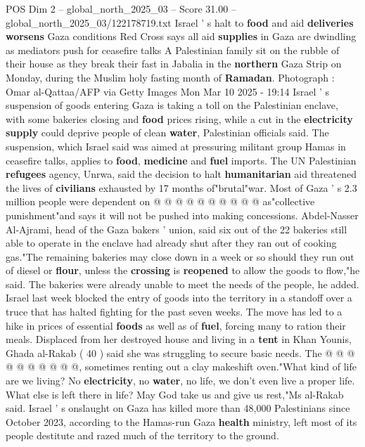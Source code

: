 \begin{textsample}{POS Dim 2 – global\_north\_2025\_03 – Score 31.00 – global\_north\_2025\_03/122178719.txt}  \label{ex:f2_pos_401}
Israel ' s halt to \textbf{food} and aid \textbf{deliveries} \textbf{worsens} Gaza conditions Red Cross says all aid \textbf{supplies} in Gaza are dwindling as mediators push for ceasefire talks A Palestinian family sit on the rubble of their house as they break their fast in Jabalia in the \textbf{northern} Gaza Strip on Monday, during the Muslim holy fasting month of \textbf{Ramadan}.
Photograph : Omar al-Qattaa/AFP via Getty Images Mon Mar 10 2025 - 19:14 Israel ' s suspension of goods entering Gaza is taking a toll on the Palestinian enclave, with some bakeries closing and \textbf{food} prices rising, while a cut in the \textbf{electricity} \textbf{supply} could deprive people of clean \textbf{water}, Palestinian officials said.
The suspension, which Israel said was aimed at pressuring militant group Hamas in ceasefire talks, applies to \textbf{food}, \textbf{medicine} and \textbf{fuel} imports.
The UN Palestinian \textbf{refugees} agency, Unrwa, said the decision to halt \textbf{humanitarian} aid threatened the lives of \textbf{civilians} exhausted by 17 months of"brutal"war.
Most of Gaza ' s 2.3 million people were dependent on @ @ @ @ @ @ @ @ @ @ as"collective punishment"and says it will not be pushed into making concessions.
Abdel-Nasser Al-Ajrami, head of the Gaza bakers ' union, said six out of the 22 bakeries still able to operate in the enclave had already shut after they ran out of cooking gas."The remaining bakeries may close down in a week or so should they run out of diesel or \textbf{flour}, unless the \textbf{crossing} is \textbf{reopened} to allow the goods to flow,"he said.
The bakeries were already unable to meet the needs of the people, he added.
Israel last week blocked the entry of goods into the territory in a standoff over a truce that has halted fighting for the past seven weeks.
The move has led to a hike in prices of essential \textbf{foods} as well as of \textbf{fuel}, forcing many to ration their meals.
Displaced from her destroyed house and living in a \textbf{tent} in Khan Younis, Ghada al-Rakab ( 40 ) said she was struggling to secure basic needs.
The @ @ @ @ @ @ @ @ @ @, sometimes renting out a clay makeshift oven."What kind of life are we living?
No \textbf{electricity}, no \textbf{water}, no life, we don't even live a proper life.
What else is left there in life?
May God take us and give us rest,"Ms al-Rakab said.
Israel ' s onslaught on Gaza has killed more than 48,000 Palestinians since October 2023, according to the Hamas-run Gaza \textbf{health} ministry, left most of its people destitute and razed much of the territory to the ground.

\end{textsample}
